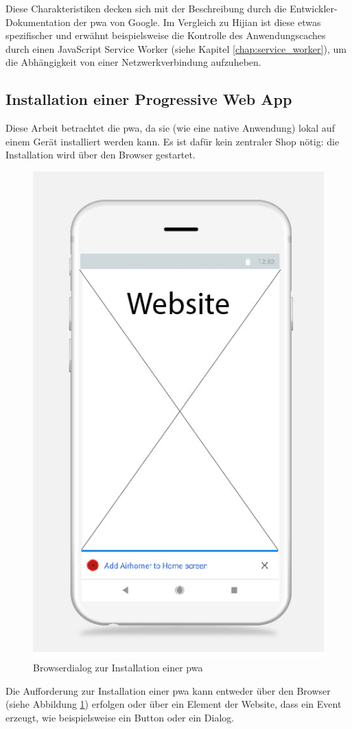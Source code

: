 \cite[S. 1f.]{Hajian2019}
Diese Charakteristiken decken sich mit der Beschreibung durch die Entwickler-Dokumentation der \ac{pwa} von Google. Im Vergleich zu Hijian ist diese etwas spezifischer und erwähnt beispielsweise die Kontrolle des Anwendungscaches durch einen JavaScript Service Worker (siehe Kapitel \ref{chap:service_worker}), um die Abhängigkeit von einer Netzwerkverbindung aufzuheben.
\cite{GooglePWAOverview}

\subsection{Installation einer Progressive Web App}

Diese Arbeit betrachtet die \ac{pwa}, da sie (wie eine native Anwendung) lokal auf einem Gerät installiert werden kann. Es ist dafür kein zentraler Shop nötig: die Installation wird über den Browser gestartet.

\begin{figure}[H]
        \centering
        \includegraphics[width=0.6\linewidth]{img/Wireframe_install_pwa.jpg}
        \caption{Browserdialog zur Installation einer \ac{pwa} \cite{PWAAddToHomeScreenPrompt}}
        \label{fig:pwainstallationprompt}
\end{figure}

Die Aufforderung zur Installation einer \ac{pwa} kann entweder über den Browser (siehe Abbildung \ref{fig:pwainstallationprompt}) erfolgen oder über ein Element der Website, dass ein Event erzeugt, wie beispielsweise ein Button oder ein Dialog. 

